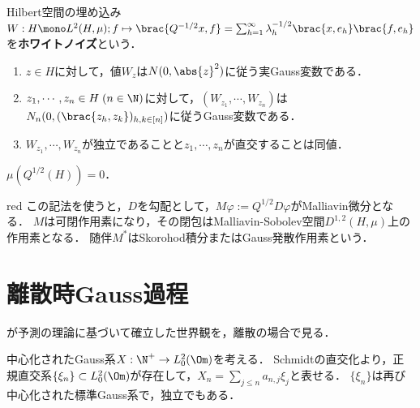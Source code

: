 \documentclass[uplatex,dvipdfmx]{jsreport}
\begin{document}
\begin{definition}\label{def-white-noise-1}
    Hilbert空間の埋め込み$W:H\mono L^2(H,\mu);f\mapsto \brac{Q^{-1/2}x,f}=\sum_{h=1}^\infty\lambda_h^{-1/2}\brac{x,e_h}\brac{f,e_h}$
    を\textbf{ホワイトノイズ}という．
\end{definition}

\begin{proposition}\mbox{}\label{prop-property-of-white-noise}
    \begin{enumerate}
        \item $z\in H$に対して，値$W_z$は$N(0,\abs{z}^2)$に従う実Gauss変数である．
        \item $z_1,\cdots,z_n\in H\;(n\in\N)$に対して，$(W_{z_1},\cdots,W_{z_n})$は$N_n(0,(\brac{z_h,z_k})_{h,k\in[n]})$に従うGauss変数である．
        \item $W_{z_1},\cdots,W_{z_n}$が独立であることと$z_1,\cdots,z_n$が直交することは同値．
    \end{enumerate}
\end{proposition}

\begin{proposition}
    $\mu(Q^{1/2}(H))=0$．
\end{proposition}

\begin{tbox}{red}{}
    この記法を使うと，$D$を勾配として，$M\varphi:=Q^{1/2}D\varphi$がMalliavin微分となる．
    $M$は可閉作用素になり，その閉包はMalliavin-Sobolev空間$D^{1,2}(H,\mu)$上の作用素となる．
    随伴$M^*$はSkorohod積分またはGauss発散作用素という．
\end{tbox}

\section{離散時Gauss過程}

\begin{tcolorbox}[colframe=ForestGreen, colback=ForestGreen!10!white,breakable,colbacktitle=ForestGreen!40!white,coltitle=black,fonttitle=\bfseries\sffamily,
title=]
    \cite{Hida-Gauss}が予測の理論に基づいて確立した世界観を，離散の場合で見る．
\end{tcolorbox}

\begin{notation}
    中心化されたGauss系$X:\N^+\to L^2_0(\Om)$を考える．
    Schmidtの直交化より，正規直交系$\{\xi_n\}\subset L^2_0(\Om)$が存在して，$X_n=\sum_{j\le n}a_{n,j}\xi_j$と表せる．
    $\{\xi_n\}$は再び中心化された標準Gauss系で，独立でもある．
\end{notation}
\end{document}
